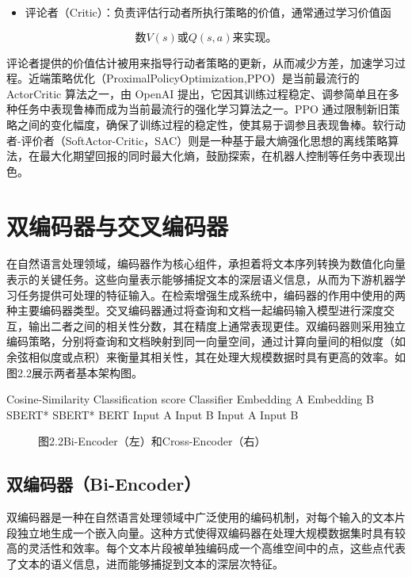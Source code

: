 \documentclass[12pt,a4paper,openright,UTF8]{ctexbook}
\begin{document}
\begin{itemize}
\item 评论者（Critic）：负责评估行动者所执行策略的价值，通常通过学习价值函
\end{itemize}

\begin{equation}
数V(s)或Q(s,a) 来实现。
\end{equation}

评论者提供的价值估计被用来指导行动者策略的更新，从而减少方差，加速学习过程。近端策略优化（ProximalPolicyOptimization,PPO）是当前最流行的ActorCritic 算法之一，由 OpenAI 提出，它因其训练过程稳定、调参简单且在多种任务中表现鲁棒而成为当前最流行的强化学习算法之一。PPO 通过限制新旧策略之间的变化幅度，确保了训练过程的稳定性，使其易于调参且表现鲁棒。软行动者-评价者（SoftActor-Critic，SAC）则是一种基于最大熵强化思想的离线策略算法，在最大化期望回报的同时最大化熵，鼓励探索，在机器人控制等任务中表现出色。

\section{双编码器与交叉编码器}

在自然语言处理领域，编码器作为核心组件，承担着将文本序列转换为数值化向量表示的关键任务。这些向量表示能够捕捉文本的深层语义信息，从而为下游机器学习任务提供可处理的特征输入。在检索增强生成系统中，编码器的作用中使用的两种主要编码器类型。交叉编码器通过将查询和文档一起编码输入模型进行深度交互，输出二者之间的相关性分数，其在精度上通常表现更佳。双编码器则采用独立编码策略，分别将查询和文档映射到同一向量空间，通过计算向量间的相似度（如余弦相似度或点积）来衡量其相关性，其在处理大规模数据时具有更高的效率。如图2.2展示两者基本架构图。


Cosine-Similarity Classification score Classifier Embedding A Embedding B SBERT* SBERT* BERT Input A Input B Input A Input B

\begin{figure}[htbp]
\centering
{}
\caption{图2.2Bi-Encoder（左）和Cross-Encoder（右）}
\end{figure}


\subsection{双编码器（Bi-Encoder）}

双编码器是一种在自然语言处理领域中广泛使用的编码机制，对每个输入的文本片段独立地生成一个嵌入向量。这种方式使得双编码器在处理大规模数据集时具有较高的灵活性和效率。每个文本片段被单独编码成一个高维空间中的点，这些点代表了文本的语义信息，进而能够捕捉到文本的深层次特征。
\end{document}
